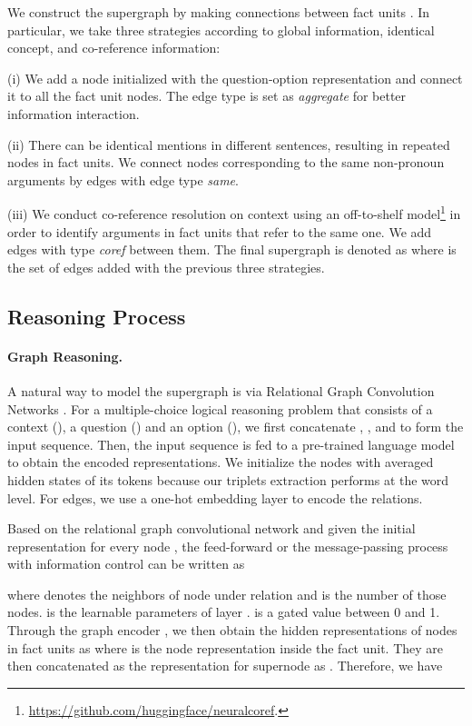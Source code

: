\documentclass[11pt]{article}
\begin{document}
We construct the supergraph by making connections between fact units . In particular, we take three strategies according to global information, identical concept, and co-reference information:

(i) We add a node  initialized with the question-option representation and connect it to all the fact unit nodes. The edge type is set as \textit{aggregate} for better information interaction. 

(ii) There can be identical mentions in different sentences, resulting in repeated nodes in fact units. We connect nodes corresponding to the same non-pronoun arguments by edges with edge type \textit{same}. 

(iii) We conduct co-reference resolution on context using an off-to-shelf model\footnote{\url{https://github.com/huggingface/neuralcoref}.} in order to identify arguments in fact units that refer to the same one. We add edges with type \textit{coref} between them. The final supergraph is denoted as  where  is the set of edges added with the previous three strategies.


\subsection{Reasoning Process}
\paragraph{Graph Reasoning.}A natural way to model the supergraph is via Relational Graph Convolution Networks \citep{10.1007/978-3-319-93417-4_38}. For a multiple-choice logical reasoning problem that consists of a context (), a question () and an option (), we first concatenate , , and  to form the input sequence. Then, the input sequence is fed to a pre-trained language model to obtain the encoded representations. We initialize the nodes with averaged hidden states of its tokens because our triplets extraction performs at the word level. For edges, we use a one-hot embedding layer to encode the relations.

Based on the relational graph convolutional network  and given the initial representation  for every node , the feed-forward or the message-passing process with information control can be written as

where  denotes the neighbors of node  under relation  and  is the number of those nodes.  is the learnable parameters of layer .  is a gated value between 0 and 1. Through the graph encoder , we then obtain the hidden representations of nodes in fact units as  where  is the node representation inside the fact unit. They are then concatenated as the representation for supernode as . Therefore, we have 
\end{document}
